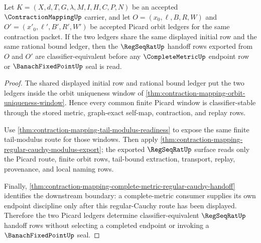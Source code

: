 \begin{theorem}
\label{thm:contraction-mapping-picard-regular-cauchy-uniqueness}
Let $K=(X,d,T,G,\lambda,M,I,H,C,P,N)$ be an accepted $\ContractionMappingUp$ carrier, and let $O=(x_0,\ell,B,R,W)$ and $O'=(x'_0,\ell',B',R',W')$ be accepted Picard orbit ledgers for the same contraction packet. If the two ledgers share the same displayed initial row and the same rational bound ledger, then the $\RegSeqRatUp$ handoff rows exported from $O$ and $O'$ are classifier-equivalent before any $\CompleteMetricUp$ endpoint row or $\BanachFixedPointUp$ seal is read.
\end{theorem}
\begin{proof}
The shared displayed initial row and rational bound ledger put the two ledgers inside the orbit uniqueness window of \autoref{thm:contraction-mapping-orbit-uniqueness-window}. Hence every common finite Picard window is classifier-stable through the stored metric, graph-exact self-map, contraction, and replay rows.

Use \autoref{thm:contraction-mapping-tail-modulus-readiness} to expose the same finite tail-modulus route for those windows. Then apply \autoref{thm:contraction-mapping-regular-cauchy-modulus-export}; the exported $\RegSeqRatUp$ surface reads only the Picard route, finite orbit rows, tail-bound extraction, transport, replay, provenance, and local naming rows.

Finally, \autoref{thm:contraction-mapping-complete-metric-regular-cauchy-handoff} identifies the downstream boundary: a complete-metric consumer supplies its own endpoint discipline only after this regular-Cauchy route has been displayed. Therefore the two Picard ledgers determine classifier-equivalent $\RegSeqRatUp$ handoff rows without selecting a completed endpoint or invoking a $\BanachFixedPointUp$ seal.
\end{proof}

